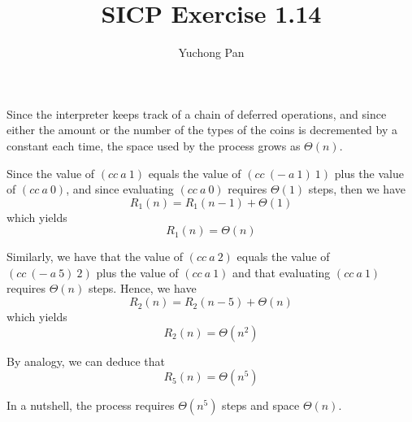 \documentclass[11pt, oneside]{article}
\title{SICP Exercise 1.14}
\author{Yuchong Pan}
\begin{document}
\maketitle

Since the interpreter keeps track of a chain of deferred operations, and since either the amount or the number of the types of the coins is decremented by a constant each time, the space used by the process grows as $\Theta(n)$.

Since the value of $(cc~a~1)$ equals the value of $(cc~(-~a~1)~1)$ plus the value of $(cc~a~0)$, and since evaluating $(cc~a~0)$ requires $\Theta(1)$ steps, then we have
$$R_1(n) = R_1(n-1)+\Theta(1)$$
which yields
$$R_1(n) = \Theta(n)$$

Similarly, we have that the value of $(cc~a~2)$ equals the value of $(cc~(-~a~5)~2)$ plus the value of $(cc~a~1)$ and that evaluating $(cc~a~1)$ requires $\Theta(n)$ steps. Hence, we have
$$R_2(n) = R_2(n-5)+\Theta(n)$$
which yields
$$R_2(n) = \Theta(n^2)$$

By analogy, we can deduce that
$$R_5(n) = \Theta(n^5)$$

In a nutshell, the process requires $\Theta(n^5)$ steps and space $\Theta(n)$.
\end{document}
